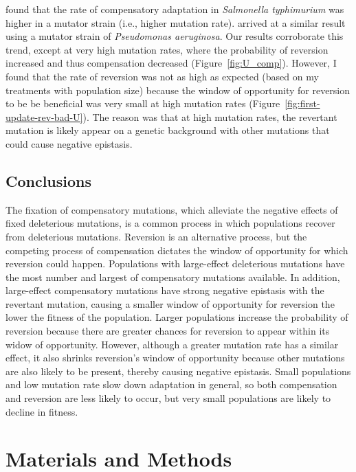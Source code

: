 \begin{doublespace}
\citet{mai02} found that the rate
of compensatory adaptation in \emph{Salmonella typhimurium}
was higher in a mutator strain (i.e., higher mutation rate).
%
\citet{per10} arrived at a similar result
using a mutator strain of \emph{Pseudomonas aeruginosa}.
%
Our results corroborate this trend, except at very high mutation rates,
where the probability of reversion increased and thus compensation decreased
(Figure~\ref{fig:U_comp}).
%
However, I found that the rate of reversion was not as high as expected
(based on my treatments with population size)
because the window of opportunity for reversion to be be beneficial
was very small at high mutation rates (Figure~\ref{fig:first-update-rev-bad-U}).
%
The reason was that at high mutation rates,
the revertant mutation is likely appear on a genetic background
with other mutations that could cause negative epistasis.



\subsection{Conclusions}



The fixation of compensatory mutations,
which alleviate the negative effects of fixed deleterious mutations,
is a common process in which populations recover from deleterious mutations.
%
Reversion is an alternative process,
but the competing process of compensation
dictates the window of opportunity for which reversion could happen.
%
Populations with large-effect deleterious mutations
have the most number and largest of compensatory mutations available.
%
In addition, large-effect compensatory mutations
have strong negative epistasis with the revertant mutation,
causing a smaller window of opportunity for reversion
the lower the fitness of the population.
%
Larger populations increase the probability of reversion
because there are greater chances for reversion to appear
within its widow of opportunity.
%
However, although a greater mutation rate has a similar effect,
it also shrinks reversion's window of opportunity
because other mutations are also likely to be present,
thereby causing negative epistasis.
%
Small populations and low mutation rate slow down adaptation
in general, so both compensation and reversion are less likely to occur,
but very small populations are likely to decline in fitness.



\section{Materials and Methods}




\end{doublespace}
